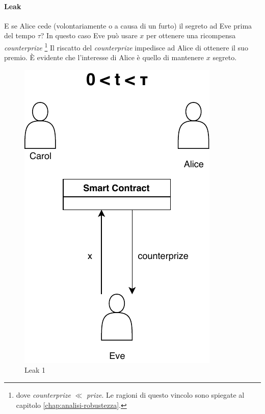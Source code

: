 \paragraph{Leak}
E se Alice cede (volontariamente o a causa di un furto)
il segreto ad Eve prima del tempo $ \tau $?
In questo caso Eve può usare $ x $ per ottenere una ricompensa
\textit{counterprize} \footnote{dove \textit{counterprize} $ \ll $ \textit{prize}.
	Le ragioni di questo vincolo sono spiegate al capitolo \ref{chap:analisi-robustezza}.}
Il riscatto del \textit{counterprize} impedisce ad Alice di ottenere il suo premio.
È evidente che l'interesse di Alice è quello di mantenere $ x $ segreto.
\begin{figure}[H]
	\begin{minipage}{0.4\textwidth}
		\centering
		\includegraphics[width=.7\linewidth]{images/chap_protocollo/base-leak-1.pdf}
		\caption{Leak 1}
	\end{minipage}\hfill
	\begin{minipage}{0.4\textwidth}
		\centering

\end{minipage}
\end{figure}
